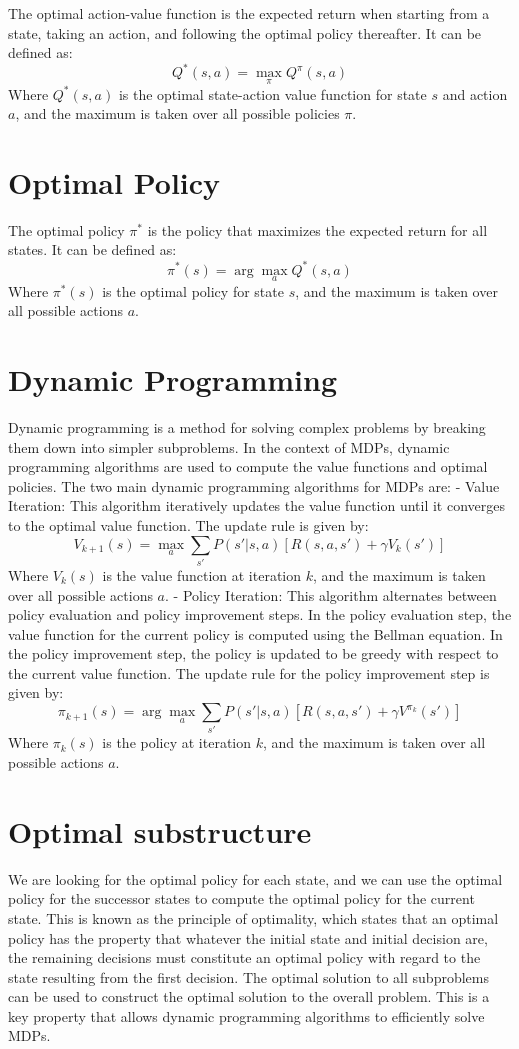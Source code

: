 \documentclass[conference]{IEEEtran}
\begin{document}
The optimal action-value function is the expected return when starting from a state, taking an action, and following the optimal policy thereafter. It can be defined as:
$$ Q^*(s,a) = \max_{\pi} Q^{\pi}(s,a) $$
Where $Q^*(s,a)$ is the optimal state-action value function for state $s$ and action $a$, and the maximum is taken over all possible policies $\pi$.
\section*{Optimal Policy}
The optimal policy $\pi^*$ is the policy that maximizes the expected return for all states. It can be defined as:
$$ \pi^*(s) = \arg\max_{a} Q^*(s,a) $$
Where $\pi^*(s)$ is the optimal policy for state $s$, and the maximum is taken over all possible actions $a$.

\section{Dynamic Programming}

Dynamic programming is a method for solving complex problems by breaking them down into simpler subproblems. In the context of MDPs, dynamic programming algorithms are used to compute the value functions and optimal policies. The two main dynamic programming algorithms for MDPs are:
- Value Iteration: This algorithm iteratively updates the value function until it converges to the
optimal value function. The update rule is given by:
$$ V_{k+1}(s) = \max_{a} \sum_{s'} P(s'|s,a) \left[ R(s,a,s') + \gamma V_k(s') \right] $$
Where $V_k(s)$ is the value function at iteration $k$, and the maximum is taken over all possible actions $a$.
- Policy Iteration: This algorithm alternates between policy evaluation and policy improvement steps. In the policy evaluation step, the value function for the current policy is computed using the Bellman equation. In the policy improvement step, the policy is updated to be greedy with respect to the current value function. The update rule for the policy improvement step is given by:
$$ \pi_{k+1}(s) = \arg\max_{a} \sum_{s'} P(s'|s,a) \left[ R(s,a,s') + \gamma V^{\pi_k}(s') \right] $$
Where $\pi_k(s)$ is the policy at iteration $k$, and the maximum is taken over all possible actions $a$.

\section*{Optimal substructure}
We are looking for the optimal policy for each state, and we can use the optimal policy for the successor states to compute the optimal policy for the current state. This is known as the principle of optimality, which states that an optimal policy has the property that whatever the initial state and initial decision are, the remaining decisions must constitute an optimal policy with regard to the state resulting from the first decision.
The optimal solution to all subproblems can be used to construct the optimal solution to the overall problem. This is a key property that allows dynamic programming algorithms to efficiently solve MDPs.
\end{document}
